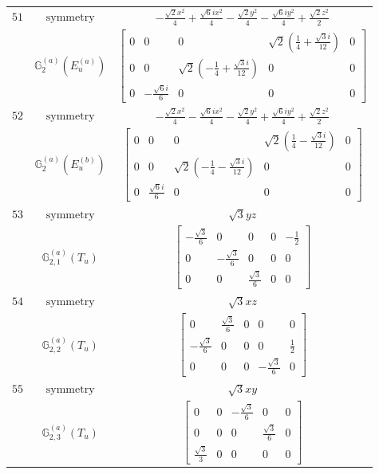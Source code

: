 \documentclass[fleqn,8pt,landscape]{jsarticle}
\begin{document}
\begin{longtable}{ccc}
$ 51 $ & $ \text{symmetry} $ & $ - \frac{\sqrt{2} x^{2}}{4} + \frac{\sqrt{6} i x^{2}}{4} - \frac{\sqrt{2} y^{2}}{4} - \frac{\sqrt{6} i y^{2}}{4} + \frac{\sqrt{2} z^{2}}{2} $ \\
$  $ & $ \mathbb{G}_{2}^{(a)}(E_{u}^{(a)}) $ & $ \begin{bmatrix} 0 & 0 & 0 & \sqrt{2} \left(\frac{1}{4} + \frac{\sqrt{3} i}{12}\right) & 0 \\ 0 & 0 & \sqrt{2} \left(- \frac{1}{4} + \frac{\sqrt{3} i}{12}\right) & 0 & 0 \\ 0 & - \frac{\sqrt{6} i}{6} & 0 & 0 & 0 \end{bmatrix} $ \\ \hline
$ 52 $ & $ \text{symmetry} $ & $ - \frac{\sqrt{2} x^{2}}{4} - \frac{\sqrt{6} i x^{2}}{4} - \frac{\sqrt{2} y^{2}}{4} + \frac{\sqrt{6} i y^{2}}{4} + \frac{\sqrt{2} z^{2}}{2} $ \\
$  $ & $ \mathbb{G}_{2}^{(a)}(E_{u}^{(b)}) $ & $ \begin{bmatrix} 0 & 0 & 0 & \sqrt{2} \left(\frac{1}{4} - \frac{\sqrt{3} i}{12}\right) & 0 \\ 0 & 0 & \sqrt{2} \left(- \frac{1}{4} - \frac{\sqrt{3} i}{12}\right) & 0 & 0 \\ 0 & \frac{\sqrt{6} i}{6} & 0 & 0 & 0 \end{bmatrix} $ \\ \hline
$ 53 $ & $ \text{symmetry} $ & $ \sqrt{3} y z $ \\
$  $ & $ \mathbb{G}_{2,1}^{(a)}(T_{u}) $ & $ \begin{bmatrix} - \frac{\sqrt{3}}{6} & 0 & 0 & 0 & - \frac{1}{2} \\ 0 & - \frac{\sqrt{3}}{6} & 0 & 0 & 0 \\ 0 & 0 & \frac{\sqrt{3}}{6} & 0 & 0 \end{bmatrix} $ \\ \hline
$ 54 $ & $ \text{symmetry} $ & $ \sqrt{3} x z $ \\
$  $ & $ \mathbb{G}_{2,2}^{(a)}(T_{u}) $ & $ \begin{bmatrix} 0 & \frac{\sqrt{3}}{6} & 0 & 0 & 0 \\ - \frac{\sqrt{3}}{6} & 0 & 0 & 0 & \frac{1}{2} \\ 0 & 0 & 0 & - \frac{\sqrt{3}}{6} & 0 \end{bmatrix} $ \\ \hline
$ 55 $ & $ \text{symmetry} $ & $ \sqrt{3} x y $ \\
$  $ & $ \mathbb{G}_{2,3}^{(a)}(T_{u}) $ & $ \begin{bmatrix} 0 & 0 & - \frac{\sqrt{3}}{6} & 0 & 0 \\ 0 & 0 & 0 & \frac{\sqrt{3}}{6} & 0 \\ \frac{\sqrt{3}}{3} & 0 & 0 & 0 & 0 \end{bmatrix} $ \\ \hline

\end{longtable}
\end{document}
